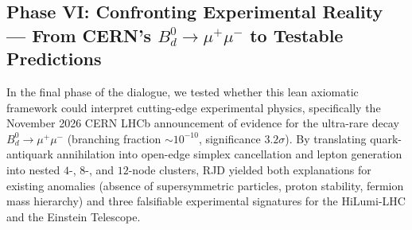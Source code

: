 \documentclass[11pt,a4paper]{article}
\theoremstyle{plain}
\theoremstyle{definition}
\theoremstyle{remark}
\begin{document}
\subsection{Phase VI: Confronting Experimental Reality — From CERN's $B_d^0 \to \mu^+\mu^-$ to Testable Predictions}
In the final phase of the dialogue, we tested whether this lean axiomatic framework could interpret cutting-edge experimental physics, specifically the November 2026 CERN LHCb announcement of evidence for the ultra-rare decay $B_d^0 \to \mu^+\mu^-$ (branching fraction $\sim 10^{-10}$, significance $3.2\sigma$). By translating quark-antiquark annihilation into open-edge simplex cancellation and lepton generation into nested $4$-, $8$-, and $12$-node clusters, RJD yielded both explanations for existing anomalies (absence of supersymmetric particles, proton stability, fermion mass hierarchy) and three falsifiable experimental signatures for the HiLumi-LHC and the Einstein Telescope.
\end{document}
